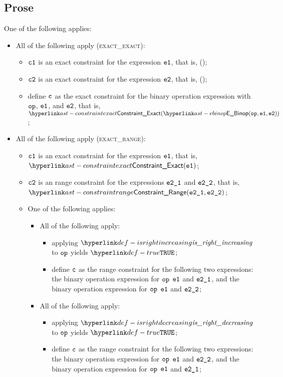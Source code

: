 \subsection{Prose}
One of the following applies:
\begin{itemize}
  \item All of the following apply (\textsc{exact\_exact}):
  \begin{itemize}
    \item $\texttt{c1}$ is an exact constraint for the expression $\texttt{e1}$, that is, \ConstraintExact(\veone);
    \item $\texttt{c2}$ is an exact constraint for the expression $\texttt{e2}$, that is, \ConstraintExact(\vetwo);
    \item define $\texttt{c}$ as the exact constraint for the binary operation expression with $\texttt{op}$, $\texttt{e1}$, and $\texttt{e2}$,
          that is, $\ConstraintExact(\EBinop(\op, \veone, \vetwo))$;
  \end{itemize}

  \item All of the following apply (\textsc{exact\_range}):
  \begin{itemize}
    \item $\texttt{c1}$ is an exact constraint for the expression $\texttt{e1}$, that is, $\ConstraintExact(\veone)$;
    \item $\texttt{c2}$ is an range constraint for the expressions $\texttt{e2\_1}$ and $\texttt{e2\_2}$, that is, \\ $\ConstraintRange(\vetwoone, \vetwotwo)$;
    \item One of the following applies:
    \begin{itemize}
      \item All of the following apply:
      \begin{itemize}
          \item applying $\isrightincreasing$ to $\texttt{op}$ yields $\True$;
          \item define $\texttt{c}$ as the range constraint for the following two expressions:
          the binary operation expression for $\texttt{op}$ $\texttt{e1}$ and $\texttt{e2\_1}$, and
          the binary operation expression for $\texttt{op}$ $\texttt{e1}$ and $\texttt{e2\_2}$;
      \end{itemize}

      \item All of the following apply:
      \begin{itemize}
          \item applying $\isrightdecreasing$ to $\texttt{op}$ yields $\True$;
          \item define $\texttt{c}$ as the range constraint for the following two expressions:
          the binary operation expression for $\texttt{op}$ $\texttt{e1}$ and $\texttt{e2\_2}$, and
          the binary operation expression for $\texttt{op}$ $\texttt{e1}$ and $\texttt{e2\_1}$;
      \end{itemize}


\end{itemize}
\end{itemize}
\end{itemize}
